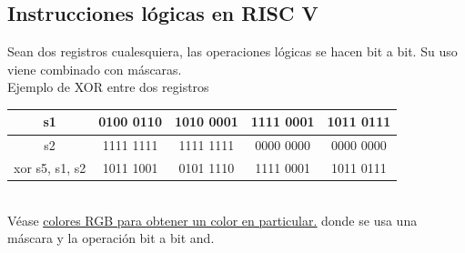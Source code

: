 \documentclass[10pt,a4paper]{article}
\begin{document}
\subsection*{Instrucciones lógicas en RISC V}
Sean dos registros cualesquiera, las operaciones lógicas se hacen bit a bit. Su uso viene combinado con máscaras. \\
Ejemplo de XOR entre dos registros
\begin{table}[h!]
    \centering
    \begin{tabular}{|c | c | c | c| c|}
    \hline
    s1 & 0100 0110 & 1010 0001 & 1111 0001 & 1011 0111 \\ \hline
    s2 & 1111 1111 & 1111 1111 & 0000 0000 & 0000 0000 \\ \hline
    xor s5, s1, s2 & 1011 1001 & 0101 1110 & 1111 0001 & 1011 0111 \\
    \hline
    \end{tabular}
    \label{tab:xor}
\end{table} 
\\
Véase \hyperref[subsec:byte_particular_desplazamiento]{\underline{colores RGB para obtener un color en particular.}} donde se usa una máscara y la operación bit a bit and.
\end{document}
